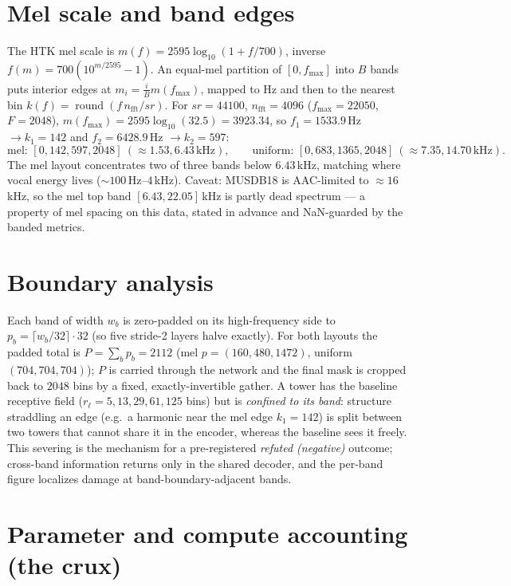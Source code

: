 \documentclass[11pt]{article}
\newcommand{\round}{\operatorname{round}}
\begin{document}
\section{Mel scale and band edges}

The HTK mel scale is $m(f)=2595\log_{10}(1+f/700)$, inverse
$f(m)=700(10^{m/2595}-1)$. An equal-mel partition of $[0,f_{\max}]$ into $B$ bands
puts interior edges at $m_i=\tfrac iB m(f_{\max})$, mapped to Hz and then to the
nearest bin $k(f)=\round(f\,n_{\text{fft}}/sr)$. For $sr=44100$,
$n_{\text{fft}}=4096$ ($f_{\max}=22050$, $F=2048$),
$m(f_{\max})=2595\log_{10}(32.5)=3923.34$, so $f_1=1533.9$\,Hz $\to k_1=142$ and
$f_2=6428.9$\,Hz $\to k_2=597$:
\[
\text{mel: } [0,142,597,2048]\ (\approx1.53,6.43\,\text{kHz}),\qquad
\text{uniform: } [0,683,1365,2048]\ (\approx7.35,14.70\,\text{kHz}).
\]
The mel layout concentrates two of three bands below $6.43$\,kHz, matching where
vocal energy lives ($\sim100$\,Hz--$4$\,kHz). Caveat: MUSDB18 is AAC-limited to
$\approx16$\,kHz, so the mel top band $[6.43,22.05]$\,kHz is partly dead spectrum
--- a property of mel spacing on this data, stated in advance and NaN-guarded by
the banded metrics.

\section{Boundary analysis}

Each band of width $w_b$ is zero-padded on its high-frequency side to
$p_b=\lceil w_b/32\rceil\cdot32$ (so five stride-2 layers halve exactly). For both
layouts the padded total is $P=\sum_b p_b=2112$ (mel $p=(160,480,1472)$, uniform
$(704,704,704)$); $P$ is carried through the network and the final mask is cropped
back to $2048$ bins by a fixed, exactly-invertible gather. A tower has the
baseline receptive field ($r_\ell=5,13,29,61,125$ bins) but is \emph{confined to
its band}: structure straddling an edge (e.g.\ a harmonic near the mel edge
$k_1=142$) is split between two towers that cannot share it in the encoder,
whereas the baseline sees it freely. This severing is the mechanism for a
pre-registered \emph{refuted (negative)} outcome; cross-band information returns
only in the shared decoder, and the per-band figure localizes damage at
band-boundary-adjacent bands.

\section{Parameter and compute accounting (the crux)}
\end{document}
